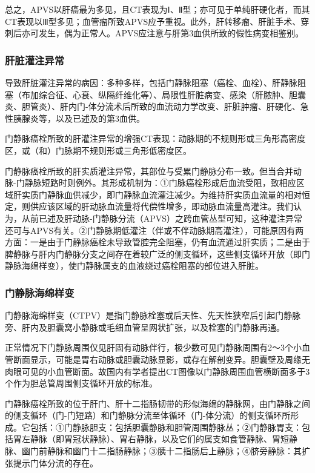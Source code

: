 总之，APVS以肝癌最为多见，且CT表现为Ⅰ、Ⅱ型；亦可见于单纯肝硬化者，而其CT表现以Ⅲ型多见；血管瘤所致APVS应予重视。此外，肝转移瘤、肝脏手术、穿刺后亦可发生，偶为正常人。APVS应注意与肝第3血供所致的假性病变相鉴别。

\subsubsection{肝脏灌注异常}

导致肝脏灌注异常的病因：多种多样，包括门静脉阻塞（癌栓、血栓）、肝静脉阻塞（布加综合征、心衰、纵隔纤维化等）、局限性肝脏病变、感染（肝脓肿、胆囊炎、胆管炎）、肝内门-体分流术后所致的血流动力学改变、肝脏肿瘤、肝硬化、急性胰腺炎等，以及已述及的第3血供。

门静脉癌栓所致的肝灌注异常的增强CT表现：动脉期的不规则形或三角形高密度区，或（和）门脉期不规则形或三角形低密度区。

门静脉癌栓所致的肝实质灌注异常，其部位与受累门静脉分布一致。但当合并动脉-门静脉短路时则例外。其形成机制为：①门脉癌栓形成后血流受阻，致相应区域肝实质门静脉血供减少，即门静脉血流灌注减少。为维持肝实质血流量的相对恒定，则供应该区域的肝动脉血流量将代偿性增多，即动脉血流量高灌注。我们认为，从前已述及肝动脉-门静脉分流（APVS）之跨血管丛型可知，这种灌注异常还可与APVS有关。②门静脉期低灌注（伴或不伴动脉期高灌注），可能原因有两方面：一是由于门静脉癌栓未导致管腔完全阻塞，仍有血流通过肝实质；二是由于脾静脉与肝内门静脉分支之间存在着较广泛的侧支循环，这些侧支循环开放（即门静脉海绵样变），使门静脉属支的血液绕过癌栓阻塞的部位进入肝脏。

\subsubsection{门静脉海绵样变}

门静脉海绵样变（CTPV）是指门静脉栓塞或后天性、先天性狭窄后引起门静脉旁、肝内及胆囊窝小静脉或毛细血管呈网状扩张，以及栓塞的门静脉再通。

正常情况下门静脉周围仅见肝固有动脉伴行，极少数可见门静脉周围有2～3个小血管断面显示，可能是胃右动脉或胆囊动脉显影，或存在解剖变异。胆囊壁及周缘无肉眼可见的小血管断面。故国内有学者提出CT图像以门静脉周围血管横断面多于3个作为胆总管周围侧支循环开放的标准。

门静脉癌栓所致的位于肝门、肝十二指肠韧带的形似海绵的静脉网，由门静脉之间的侧支循环（门-门短路）和门静脉分流至体循环（门-体分流）的侧支循环所形成。它包括：①门静脉胆支：包括胆囊静脉和胆管周围静脉丛；②门静脉胃支：包括胃左静脉（即胃冠状静脉）、胃右静脉，以及它们的属支如食管静脉、胃短静脉、幽门前静脉和幽门十二指肠静脉；③胰十二指肠后上静脉；④脐旁静脉：其扩张提示门体分流的存在。

